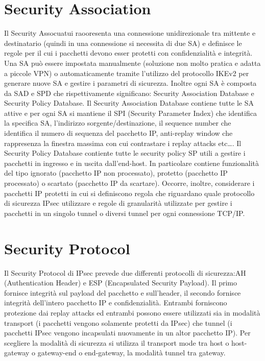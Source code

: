 \documentclass{article}
\begin{document}
\section{Security Association}
Il Security Assocuatui raooresenta una connessione unidirezionale tra mittente e destinatario (quindi in una connessione si necessita di due SA) e definisce le regole per il cui i pacchetti devono esser protetti con confidenzialità e integrità\@. Una SA può essere impostata manualmente (soluzione non molto pratica e adatta a piccole VPN) o automaticamente tramite l'utilizzo del protocollo IKEv2 per generare nuove SA e gestire i parametri di sicurezza\@. Inoltre ogni SA è composta da SAD e SPD che rispettivamente significano: Security Association Database e Security Policy Database\@.\newline
Il Security Association Database contiene tutte le SA attive e per ogni SA si mantiene il SPI (Security Parameter Index) che identifica la specifica SA, l'indirizzo sorgente/destinazione, il sequence number che identifica il numero di sequenza del pacchetto IP, anti-replay window che rappresenza la finestra massima con cui contrastare i replay attacks etc\dots \@.\newline
Il Security Policy Database contiente tutte le security policy SP utili a gestire i pacchetti in ingresso e in uscita dall'end-host\@. In particolare contiene funzionalità del tipo ignorato (pacchetto IP non processato), protetto (pacchetto IP processato) o scartato (pacchetto IP da scartare)\@. Occorre, inoltre, considerare i pacchetti IP protetti in cui si definiscono regola che riguardano quale protocollo di sicurezza IPsec utilizzare e regole di granularità utilizzate per gestire i pacchetti in un singolo tunnel o diversi tunnel per ogni connessione TCP/IP\@.
\section{Security Protocol}
Il Security Protocol di IPsec prevede due differenti protocolli di sicurezza:AH (Authentication Header) e ESP (Encapsulated Security Payload)\@. Il primo fornisce integrità sul payload del pacchetto e sull'header, il secondo fornisce integrità dell'intero pacchetto IP e confidenzialità\@.\newline
Entrambi forniscono protezione dai replay attacks ed entrambi possono essere utilizzati sia in modalità transport (i pacchetti vengono solamente protetti da IPsec) che tunnel (i pacchetti IPsec vengono incapsulati nuovamente in un altor pacchetto IP)\@. Per scegliere la modalità di sicurezza si utilizza il transport mode tra host o host-gateway o gateway-end o end-gateway, la modalità tunnel tra gateway\@.
\end{document}
